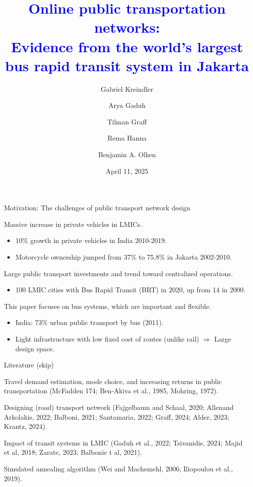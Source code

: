 \documentclass[notes,11pt, aspectratio=169]{beamer}
\title{\textcolor{blue}{Online public transportation networks:\\ \normalsize Evidence from the world's largest bus rapid transit system in Jakarta}}
\author{Gabriel Kreindler \and Arya Gaduh \and Tilman Graff \and Rema Hanna \and Benjamin A. Olken}
\institute{\textit{Conditionally accepted, AER}\\\vspace{1em} \large Presenter: Hyoungchul Kim}
\date{April 11, 2025}
\newenvironment{wideitemize}{\itemize\addtolength{\itemsep}{0.4em}}{\enditemize}
\begin{document}
\begin{frame}[plain]
	\titlepage
\end{frame}

\setcounter{framenumber}{0}

\begin{frame}{Motivation: The challenges of public transport network design}
	\begin{wideitemize}
		\item Massive increase in private vehicles in LMICs.
			\begin{itemize}
				\item 10\% growth in private vehicles in India 2010-2019.
				\item Motorcycle ownership jumped from 37\% to 75.8\% in Jakarta 2002-2010. 
			\end{itemize}
		\item Large public transport investments and trend toward centralized operations.
			\begin{itemize}
				\item 100 LMIC cities with Bus Rapid Transit (BRT) in 2020, up from 14 in 2000.
			\end{itemize}
		\item This paper focuses on bus systems, which are important and flexible.
			\begin{itemize}
				\item India: 73\% urban public transport by bus (2011).
				\item Light infrastructure with low fixed cost of routes (unlike rail) $\Rightarrow$ Large design space.
			\end{itemize}
	\end{wideitemize}	
\end{frame}

\begin{frame}{Literature (skip)}
\begin{wideitemize}
\item Travel demand estimation, mode choice, and increasing returns in public transportation (McFadden 174; Ben-Akiva et al., 1985, Mohring, 1972).
\item Designing (road) transport network (Fajgelbaum and Schaal, 2020; Allenand Arkolakis, 2022; Balboni, 2021; Santamaria, 2022; Graff, 2024; Alder, 2023; Krantz, 2024).
\item Impact of transit systems in LMIC (Gaduh et al., 2022; Tsivanidis, 2024; Majid et al, 2018; Zarate, 2023; Balbonie t al, 2021).
\item Simulated annealing algorithm (Wei and Machemehl, 2006; Iliopoulou et al., 2019).
\end{wideitemize}	
\end{frame}
\end{document}
